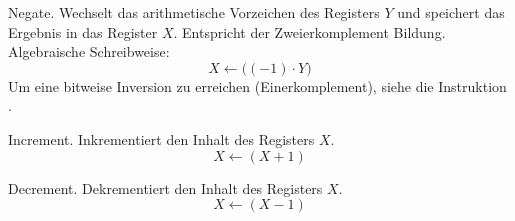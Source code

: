 \glqq Negate\grqq.
Wechselt das arithmetische Vorzeichen des Registers $Y$ und speichert das
Ergebnis in das Register $X$. Entspricht der Zweierkomplement Bildung.
Algebraische Schreibweise:
\[
    X \gets \big( (-1) \cdot Y \big)
\]
Um eine bitweise Inversion zu erreichen (Einerkomplement), siehe die
Instruktion .



\glqq Increment\grqq.
Inkrementiert den Inhalt des Registers $X$.
\[
    X \gets ( X + 1 )
\]



\glqq Decrement\grqq.
Dekrementiert den Inhalt des Registers $X$.
\[
    X \gets ( X - 1 )
\]



